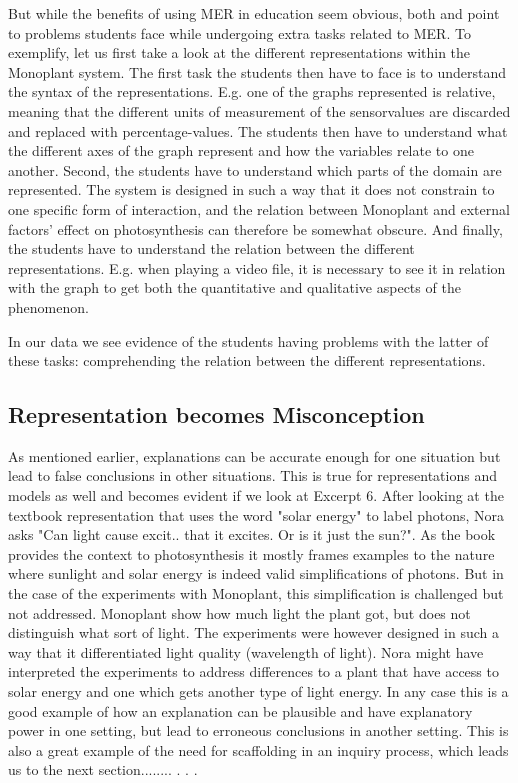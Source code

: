 But while the benefits of using MER in education seem obvious, both \citet{ainsworth1999functions} and \citet{van2006supporting} point to problems students face while undergoing extra tasks related to MER. To exemplify, let us first take a look at the different representations within the Monoplant system. The first task the students then have to face is to understand the syntax of the representations. E.g. one of the graphs represented is relative, meaning that the different units of measurement of the sensorvalues are discarded and replaced with percentage-values. The students then have to understand what the different axes of the graph represent and how the variables relate to one another. Second, the students have to understand which parts of the domain are represented. The system is designed in such a way that it does not constrain to one specific form of interaction, and the relation between Monoplant and external factors' effect on photosynthesis can therefore be somewhat obscure. And finally, the students have to understand the relation between the different representations. E.g. when playing a video file, it is necessary to see it in relation with the graph to get both the quantitative and qualitative aspects of the phenomenon. 

In our data we see evidence of the students having problems with the latter of these tasks: comprehending the relation between the different representations. 




\subsection{Representation becomes Misconception}
As mentioned earlier, explanations can be accurate enough for one situation but lead to false conclusions in other situations. \citep{smith1994misconceptions} This is true for representations and models as well and becomes evident if we look at Excerpt 6. After looking at the textbook representation that uses the word "solar energy" to label photons, Nora asks "Can light cause excit.. that it excites. Or is it just the sun?". As the book provides the context to photosynthesis it mostly frames examples to the nature where sunlight and solar energy is indeed valid simplifications of photons. But in the case of the experiments with Monoplant, this simplification is challenged but not addressed. Monoplant show how much light the plant got, but does not distinguish what sort of light. The experiments were however designed in such a way that it differentiated light quality (wavelength of light). Nora might have interpreted the experiments to address differences to a plant that have access to solar energy and one which gets another type of light energy. In any case this is a good example of how an explanation can be plausible and have explanatory power in one setting, but lead to erroneous conclusions in another setting. This is also a great example of the need for scaffolding in an inquiry process, which leads us to the next section........ . . . 









